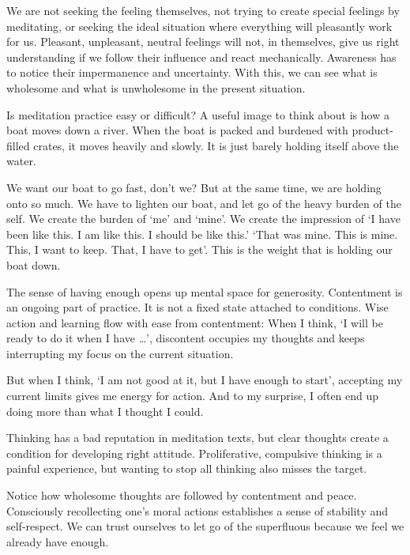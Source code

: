 We are not seeking the feeling themselves, not trying to create special
feelings by meditating, or seeking the ideal situation where everything
will pleasantly work for us. Pleasant, unpleasant, neutral feelings will
not, in themselves, give us right understanding if we follow their
influence and react mechanically. Awareness has to notice their
impermanence and uncertainty. With this, we can see what is wholesome
and what is unwholesome in the present situation.


Is meditation practice easy or difficult? A useful image to think about
is how a boat moves down a river. When the boat is packed and burdened
with product-filled crates, it moves heavily and slowly. It is just
barely holding itself above the water.

We want our boat to go fast, don't we? But at the same time, we are
holding onto so much. We have to lighten our boat, and let go of the
heavy burden of the self. We create the burden of `me' and `mine'. We
create the impression of `I have been like this. I am like this. I
should be like this.' `That was mine. This is mine. This, I want to
keep. That, I have to get'. This is the weight that is holding our boat
down.

The sense of having enough opens up mental space for generosity.
Contentment is an ongoing part of practice. It is not a fixed state
attached to conditions. Wise action and learning flow with ease from
contentment: When I think, `I will be ready to do it when I have
\ldots{}', discontent occupies my thoughts and keeps interrupting my
focus on the current situation.


But when I think, `I am not good at it, but I have enough to start',
accepting my current limits gives me energy for action. And to my
surprise, I often end up doing more than what I thought I could.

Thinking has a bad reputation in meditation texts, but clear thoughts
create a condition for developing right attitude. Proliferative,
compulsive thinking is a painful experience, but wanting to stop all
thinking also misses the target.

Notice how wholesome thoughts are followed by contentment and peace.
Consciously recollecting one's moral actions establishes a sense of
stability and self-respect. We can trust ourselves to let go of the
superfluous because we feel we already have enough.

